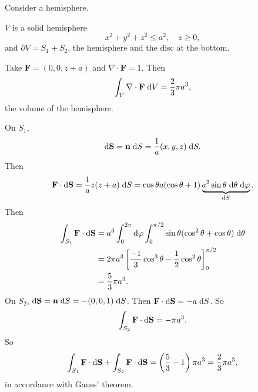 \documentclass[a4paper]{article}
\begin{document}
\begin{eg}
  Consider a hemisphere.
  \begin{center}
  \end{center}

  $V$ is a solid hemisphere
  \[
    x^2 + y^2 + z^2 \leq a^2, \quad z \geq 0,
  \]
  and $\partial V = S_1 + S_2$, the hemisphere and the disc at the bottom.

  Take $\mathbf{F} = (0, 0, z + a)$ and $\nabla \cdot \mathbf{F} = 1$. Then
  \[
    \int_V\nabla \cdot \mathbf{F}\;\mathrm{d} V = \frac{2}{3}\pi a^3,
  \]
  the volume of the hemisphere.

  On $S_1$,
  \[
    \mathrm{d} \mathbf{S} = \mathbf{n}\;\mathrm{d} S = \frac{1}{a}(x, y, z)\;\mathrm{d} S.
  \]
  Then
  \[
    \mathbf{F}\cdot \mathrm{d} \mathbf{S} = \frac{1}{a}z(z + a)\;\mathrm{d} S = \cos \theta a(\cos \theta + 1)\underbrace{a^2\sin \theta\;\mathrm{d} \theta\;\mathrm{d} \varphi}_{\mathrm{d} S}.
  \]
  Then
  \begin{align*}
    \int_{S_1}\mathbf{F}\cdot \mathrm{d} \mathbf{S} &= a^3\int_0^{2\pi}\mathrm{d} \varphi \int_0^{\pi/2}\sin \theta(\cos^2\theta + \cos \theta)\;\mathrm{d} \theta\\
    &= 2\pi a^3 \left[\frac{-1}{3}\cos^3 \theta - \frac{1}{2}\cos^2 \theta\right]_0^{\pi/2}\\
    &= \frac{5}{3}\pi a^3.
  \end{align*}
  On $S_2$, $\mathrm{d} \mathbf{S} = \mathbf{n}\;\mathrm{d} S = -(0, 0, 1)\;\mathrm{d} S$. Then $\mathbf{F}\cdot \mathrm{d} \mathbf{S} = -a\;\mathrm{d} S$. So
  \[
    \int_{S_2} \mathbf{F}\cdot \mathrm{d} \mathbf{S} = -\pi a^3.
  \]
  So
  \[
    \int_{S_1}\mathbf{F}\cdot \mathrm{d} \mathbf{S} +\int_{S_2}\mathbf{F}\cdot \mathrm{d} \mathbf{S} = \left(\frac{5}{3} - 1\right)\pi a^3 = \frac{2}{3}\pi a^3,
  \]
  in accordance with Gauss' theorem.
\end{eg}
\end{document}
